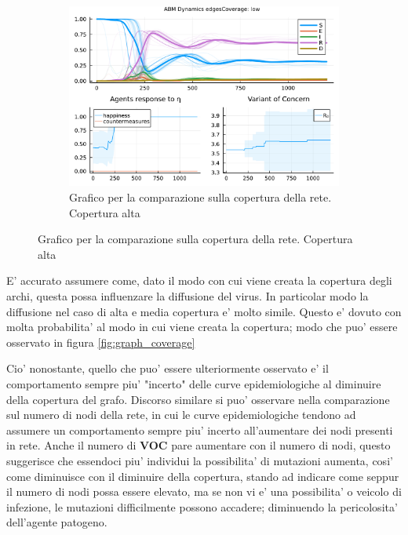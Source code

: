 \begin{figure}[!hb]
\begin{subfigure}[b]{0.3\textwidth}
		\includegraphics[width=\textwidth]{img/SocialNetworkABM_3_EC.pdf}
		\caption{Grafico per la comparazione sulla copertura della rete. Copertura alta}
		\label{fig:comparison_lowCoverage}
	\end{subfigure}
\end{figure}

E' accurato assumere come, dato il modo con cui viene creata la copertura degli archi, questa 
possa influenzare la diffusione del virus. In particolar modo la diffusione nel caso di alta e media copertura 
e' molto simile. Questo e' dovuto con molta probabilita' al modo in cui viene creata la copertura; modo che 
puo' essere osservato in figura \ref{fig:graph_coverage}

Cio' nonostante, quello che puo' essere ulteriormente osservato e' il comportamento sempre piu' "incerto" delle curve 
epidemiologiche al diminuire della copertura del grafo. Discorso similare si puo' osservare nella comparazione sul numero 
di nodi della rete, in cui le curve epidemiologiche tendono ad assumere un comportamento sempre piu' incerto all'aumentare dei 
nodi presenti in rete. Anche il numero di \textbf{VOC} pare aumentare con il numero di nodi, questo suggerisce che essendoci 
piu' individui la possibilita' di mutazioni aumenta, cosi' come diminuisce con il diminuire della copertura, stando ad indicare 
come seppur il numero di nodi possa essere elevato, ma se non vi e' una possibilita' o veicolo di infezione, le mutazioni difficilmente
possono accadere; diminuendo la pericolosita' dell'agente patogeno.

